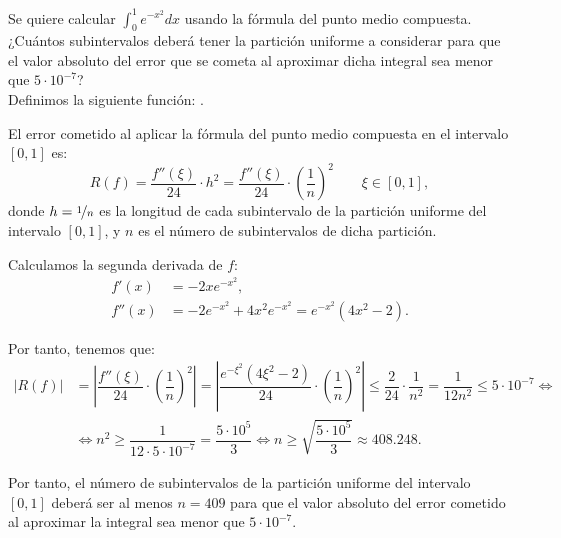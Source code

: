 \begin{ejercicio}\label{ej:2.1.19}
    Se quiere calcular $\int_{0}^{1} e^{-x^2} dx$ usando la fórmula del punto medio compuesta. ¿Cuántos subintervalos deberá tener la partición uniforme a considerar para que el valor absoluto del error que se cometa al aproximar dicha integral sea menor que $5\cdot 10^{-7}$?\\

    Definimos la siguiente función:
    .

    El error cometido al aplicar la fórmula del punto medio compuesta en el intervalo $[0, 1]$ es:  
    \begin{equation*}
        R(f) = \dfrac{f''(\xi)}{24} \cdot h^2
        = \dfrac{f''(\xi)}{24} \cdot \left(\dfrac{1}{n}\right)^2
        \qquad \xi \in [0, 1],
    \end{equation*}
    donde $h = \nicefrac{1}{n}$ es la longitud de cada subintervalo de la partición uniforme del intervalo $[0, 1]$, y $n$ es el número de subintervalos de dicha partición.

    Calculamos la segunda derivada de $f$:
    \begin{align*}
        f'(x) &= -2xe^{-x^2},\\
        f''(x) &= -2e^{-x^2} + 4x^2e^{-x^2} = e^{-x^2}(4x^2 - 2).
    \end{align*}

    Por tanto, tenemos que:
    \begin{align*}
        |R(f)| &= \left| \dfrac{f''(\xi)}{24} \cdot \left(\dfrac{1}{n}\right)^2 \right| = \left| \dfrac{e^{-\xi^2}(4\xi^2 - 2)}{24} \cdot \left(\dfrac{1}{n}\right)^2 \right|\leq \dfrac{2}{24} \cdot \dfrac{1}{n^2} = \dfrac{1}{12n^2}\leq 5\cdot 10^{-7}\iff \\&\iff
        n^2 \geq \dfrac{1}{12\cdot 5\cdot 10^{-7}} = \dfrac{5\cdot 10^5}{3}
        \iff n \geq \sqrt{\dfrac{5\cdot 10^5}{3}} \approx 408.248.
    \end{align*}

    Por tanto, el número de subintervalos de la partición uniforme del intervalo $[0, 1]$ deberá ser al menos $n = 409$ para que el valor absoluto del error cometido al aproximar la integral sea menor que $5\cdot 10^{-7}$.
\end{ejercicio}

